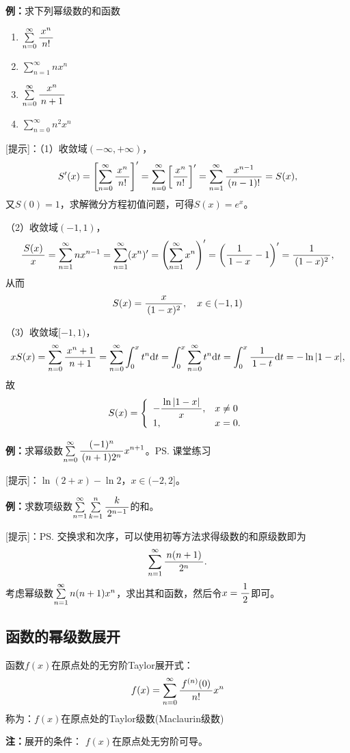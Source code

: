 {\bf 例：}求下列幂级数的和函数
\begin{enumerate}[(1)]
  \setlength{\itemindent}{1cm}
  \item $\sum\limits_{n=0}^{\infty}\df{x^n}{n!}$
  \item $\sum\limits_{n=1}^{\infty}nx^n$
  \item $\sum\limits_{n=0}^{\infty}\df{x^n}{n+1}$
  \item $\sum\limits_{n=0}^{\infty}n^2x^n$
\end{enumerate}

[提示]：（1）收敛域$(-\infty,+\infty)$，
$$S'(x)=\left[\sum\limits_{n=0}^{\infty}\df{x^n}{n!}\right]'
=\sum\limits_{n=0}^{\infty}\left[\df{x^n}{n!}\right]'
=\sum\limits_{n=1}^{\infty}\df{x^{n-1}}{(n-1)!}=S(x),$$
又$S(0)=1$，求解微分方程初值问题，可得$S(x)=e^x$。

（2）收敛域$(-1,1)$，
$$
	\df{S(x)}x=\sum\limits_{n=1}^{\infty}nx^{n-1}
	=\sum\limits_{n=1}^{\infty}(x^{n})'
	=\left(\sum\limits_{n=1}^{\infty}x^{n}\right)'
	=\left(\df1{1-x}-1\right)'=\df1{(1-x)^2},
$$
从而
$$S(x)=\df{x}{(1-x)^2},\quad x\in(-1,1)$$

（3）收敛域$[-1,1)$，
$$
xS(x)=\sum\limits_{n=0}^{\infty}\df{x^n+1}{n+1}
=\sum\limits_{n=0}^{\infty}\dint_0^x t^n\d t
=\dint_0^x \sum\limits_{n=0}^{\infty}t^n\d t
=\dint_0^x \df1{1-t}\d t=-\ln|1-x|,
$$
故
$$S(x)=\left\{\begin{array}{ll}
	-\df{\ln|1-x|}x,&x\ne0\\
	1,&x=0.
\end{array}\right.$$
\fin

{\bf 例：}求幂级数$\sumn[0]\df{(-1)^n}{(n+1)2^n}x^{n+1}$。\ps{课堂练习}

[提示]：$\ln(2+x)-\ln2$，$x\in(-2,2]$。

{\bf 例：}求数项级数$\sumn\sum\limits_{k=1}^n\df{k}{2^{n-1}}$的和。

[提示]：\ps{交换求和次序，可以使用初等方法求得级数的和}原级数即为
$$\sumn\df{n(n+1)}{2^n}.$$
考虑幂级数$\sumn n(n+1)x^n$，求出其和函数，然后令$x=\df12$即可。

\subsection{函数的幂级数展开}

函数$f(x)$在原点处的无穷阶Taylor展开式：
$$f(x)=\sum\limits_{n=0}^{\infty}\df{f^{(n)}(0)}{n!}x^n$$
 称为：{\kaishu $f(x)$在原点处的Taylor级数(Maclaurin级数)}

{\bf 注：}展开的条件： $f(x)$在原点处无穷阶可导。

